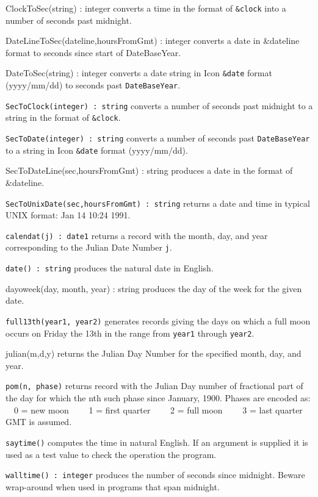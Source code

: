 \textsf{ClockToSec(string) : integer} converts a time in the format of
\texttt{\&clock} into a number of seconds past midnight.

\textsf{DateLineToSec(dateline,hoursFromGmt) : integer} converts a date
in \&dateline format to seconds since start of DateBaseYear.

\textsf{DateToSec(string) : integer} converts a date string in Icon
\texttt{\&date} format (yyyy/mm/dd) to seconds past
\texttt{DateBaseYear}.

\texttt{SecToClock(integer) : string} converts a number of seconds past
midnight to a string in the format of \texttt{\&clock}.

\texttt{SecToDate(integer) : string} converts a number of seconds past
\texttt{DateBaseYear} to a string in Icon \texttt{\&date} format
(yyyy/mm/dd).

\textsf{SecToDateLine(sec,hoursFromGmt) : string} produces a date in the
format of \textsf{\&dateline}.

\texttt{SecToUnixDate(sec,hoursFromGmt) : string} returns a date and
time in typical UNIX format: Jan 14 10:24 1991.

\texttt{calendat(j) : date1} returns a record with the month, day, and
year corresponding to the Julian Date Number \texttt{j}.

\texttt{date() : string} produces the natural date in English.

\textsf{dayoweek(day, month, year) : string} produces the day of the
week for the given date.

\texttt{full13th(year1, year2)} generates records giving the days on
which a full moon occurs on Friday the 13th in the range from
\texttt{year1} through \texttt{year2}.

\textsf{julian(m,d,y)} returns the Julian Day Number for the specified
month, day, and year.

\texttt{pom(n, phase)} returns record with the Julian Day number of
fractional part of the day for which the nth such phase since January,
1900. Phases are encoded as:\\
\ \ 0 = new moon \ \ \ \ 1 = first quarter \ \ \ \ 2 = full moon
\ \ \ \ 3 = last quarter\\
GMT is assumed.

\texttt{saytime()} computes the time in natural English. If an argument
is supplied it is used as a test value to check the operation the
program.

\texttt{walltime() : integer} produces the number of seconds since
midnight. Beware wrap-around when used in programs that span midnight.

